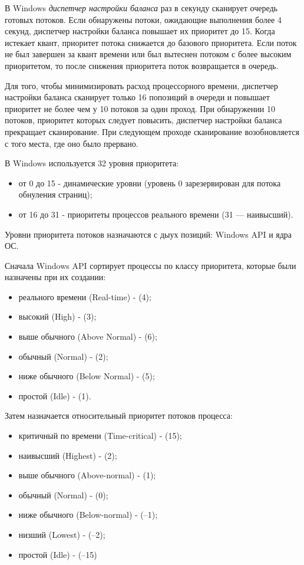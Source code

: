 В Windows \textit{диспетчер настройки баланса} раз в секунду сканирует очередь готовых потоков. Если обнаружены потоки, ожидающие выполнения более 4 секунд, диспетчер настройки баланса повышает их приоритет до 15. Когда истекает квант, приоритет потока снижается до базового приоритета. Если поток не был завершен за квант времени или был вытеснен потоком с более высоким приоритетом, то после снижения приоритета поток возвращается в очередь.

Для того, чтобы минимизировать расход процессорного времени, диспетчер настройки баланса сканирует только 16 попозиций в очереди и повышает приоритет не более чем у 10 потоков за один проход. При обнаружении 10 потоков, приоритет которых следует повысить, диспетчер настройки баланса прекращает сканирование. При следующем проходе сканирование возобновляется с того места, где оно было прервано.

В Windows используется 32 уровня приоритета:
\begin{itemize}
    \item от 0 до 15 - динамические уровни (уровень 0 зарезервирован для потока обнуления страниц);
    \item от 16 до 31 - приоритеты процессов реального времени (31 --- наивысший).
\end{itemize}

Уровни приоритета потоков назначаются с дыух позиций: Windows API и ядра ОС.

Сначала Windows API сортирует процессы по классу приоритета, которые были назначены при их создании:
\begin{itemize}
    \item реального времени (Real-time) - (4);
    \item высокий (High) - (3);
    \item выше обычного (Above Normal) - (6);
    \item обычный (Normal) - (2);
    \item ниже обычного (Below Normal) - (5);
    \item простой (Idle) - (1).
\end{itemize}

Затем назначается относительный приоритет потоков процесса:
\begin{itemize}
    \item критичный по времени (Time-critical) - (15);
    \item наивысший (Highest) - (2);
    \item выше обычного (Above-normal) - (1);
    \item обычный (Normal) - (0);
    \item ниже обычного (Below-normal) - (–1);
    \item низший (Lowest) - (–2);
    \item простой (Idle) - (–15)
\end{itemize}

